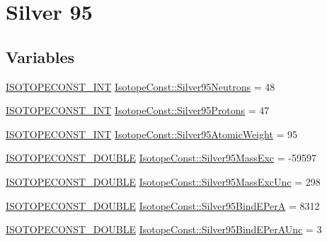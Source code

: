 \hypertarget{group___isotope_const-_silver-_ag95}{}\section{Silver 95}
\label{group___isotope_const-_silver-_ag95}
\subsection*{Variables}
\begin{DoxyCompactItemize}
\item 
\mbox{\hyperlink{group___isotope_const-_macros_ga5f18360b3e99483a35c32d789e62621c}{I\+S\+O\+T\+O\+P\+E\+C\+O\+N\+S\+T\+\_\+\+I\+NT}} \mbox{\hyperlink{group___isotope_const-_silver-_ag95_ga6f4bfda65e8c0f7303635035443b0e18}{Isotope\+Const\+::\+Silver95\+Neutrons}} = 48
\item 
\mbox{\hyperlink{group___isotope_const-_macros_ga5f18360b3e99483a35c32d789e62621c}{I\+S\+O\+T\+O\+P\+E\+C\+O\+N\+S\+T\+\_\+\+I\+NT}} \mbox{\hyperlink{group___isotope_const-_silver-_ag95_gada07e968bb2488e166866277c319266f}{Isotope\+Const\+::\+Silver95\+Protons}} = 47
\item 
\mbox{\hyperlink{group___isotope_const-_macros_ga5f18360b3e99483a35c32d789e62621c}{I\+S\+O\+T\+O\+P\+E\+C\+O\+N\+S\+T\+\_\+\+I\+NT}} \mbox{\hyperlink{group___isotope_const-_silver-_ag95_ga32630c8eaa85d095d0c0ee333db22036}{Isotope\+Const\+::\+Silver95\+Atomic\+Weight}} = 95
\item 
\mbox{\hyperlink{group___isotope_const-_macros_ga8f45a7272ce02c0b4c65c44636ed719a}{I\+S\+O\+T\+O\+P\+E\+C\+O\+N\+S\+T\+\_\+\+D\+O\+U\+B\+LE}} \mbox{\hyperlink{group___isotope_const-_silver-_ag95_ga478cf77e45d9210f296a4a8081ef9aca}{Isotope\+Const\+::\+Silver95\+Mass\+Exc}} = -\/59597
\item 
\mbox{\hyperlink{group___isotope_const-_macros_ga8f45a7272ce02c0b4c65c44636ed719a}{I\+S\+O\+T\+O\+P\+E\+C\+O\+N\+S\+T\+\_\+\+D\+O\+U\+B\+LE}} \mbox{\hyperlink{group___isotope_const-_silver-_ag95_ga23f25022670dd4210471d18977de1a53}{Isotope\+Const\+::\+Silver95\+Mass\+Exc\+Unc}} = 298
\item 
\mbox{\hyperlink{group___isotope_const-_macros_ga8f45a7272ce02c0b4c65c44636ed719a}{I\+S\+O\+T\+O\+P\+E\+C\+O\+N\+S\+T\+\_\+\+D\+O\+U\+B\+LE}} \mbox{\hyperlink{group___isotope_const-_silver-_ag95_ga5f20fc97dd988bf798fa15334f5c3919}{Isotope\+Const\+::\+Silver95\+Bind\+E\+PerA}} = 8312
\item 
\mbox{\hyperlink{group___isotope_const-_macros_ga8f45a7272ce02c0b4c65c44636ed719a}{I\+S\+O\+T\+O\+P\+E\+C\+O\+N\+S\+T\+\_\+\+D\+O\+U\+B\+LE}} \mbox{\hyperlink{group___isotope_const-_silver-_ag95_ga35fa1979bae614c9ca073bb3b453a3b1}{Isotope\+Const\+::\+Silver95\+Bind\+E\+Per\+A\+Unc}} = 3

\end{DoxyCompactItemize}
